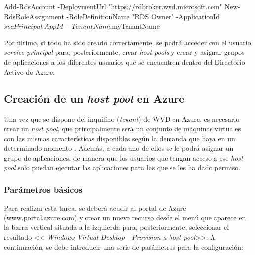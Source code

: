 \begin{console}
    Add-RdsAccount -DeploymentUrl "https://rdbroker.wvd.microsoft.com"
    New-RdsRoleAssignment -RoleDefinitionName "RDS Owner" -ApplicationId $svcPrincipal.AppId -TenantName $myTenantName
\end{console} %

Por último, si todo ha sido creado correctamente, se podrá acceder con el usuario \textit{service principal} para, posteriormente, crear \textit{host pools} y crear y asignar grupos de aplicaciones a los diferentes usuarios que se encuentren dentro del Directorio Activo de Azure:


\clearpage

\subsection{Creación de un \textit{host pool} en Azure}
Una vez que se dispone del inquilino (\textit{tenant}) de \acs{WVD} en Azure, es necesario crear un \textit{host pool}, que principalmente será un conjunto de máquinas virtuales con las mismas características disponibles según la demanda que haya en un determinado momento \cite{microsofttutohostpool}. Además, a cada uno de ellos se le podrá asignar un grupo de aplicaciones, de manera que los usuarios que tengan acceso a ese \textit{host pool} solo puedan ejecutar las aplicaciones para las que se les ha dado permiso.

\subsubsection{Parámetros básicos}
Para realizar esta tarea, se deberá acudir al portal de Azure (\url{www.portal.azure.com}) y crear un nuevo recurso desde el menú que aparece en la barra vertical situada a la izquierda para, posteriormente, seleccionar el resultado <<\textit{
Windows Virtual Desktop - Provision a host pool}>>. A continuación, se debe introducir una serie de parámetros para la configuración:

